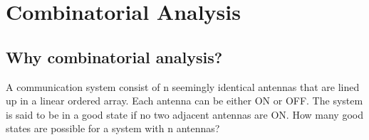 \chapter{Combinatorial Analysis}

\section{Why combinatorial analysis?}

A communication system consist of n seemingly identical antennas that are lined up in a linear ordered array. Each antenna can be either ON or OFF. The system is said to be in a good state if no two adjacent antennas are ON. How many good states are possible for a system with n antennas?